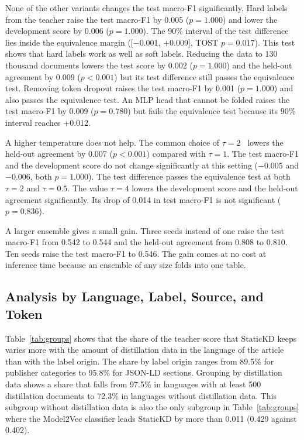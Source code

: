 \documentclass{ieeeaccess}
\begin{document}
None of the other variants changes the test macro-F1 significantly. Hard labels from the teacher raise the test macro-F1 by 0.005 ($p=1.000$) and lower the development score by 0.006 ($p=1.000$). The 90\% interval of the test difference lies inside the equivalence margin ([$-$0.001, +0.009], TOST $p=0.017$). This test shows that hard labels work as well as soft labels. Reducing the data to 130 thousand documents lowers the test score by 0.002 ($p=1.000$) and the held-out agreement by 0.009 ($p<0.001$) but its test difference still passes the equivalence test. Removing token dropout raises the test macro-F1 by 0.001 ($p=1.000$) and also passes the equivalence test. An MLP head that cannot be folded raises the test macro-F1 by 0.009 ($p=0.780$) but fails the equivalence test because its 90\% interval reaches +0.012.

A higher temperature does not help. The common choice of $\tau=2$~\cite{hinton2015distilling} lowers the held-out agreement by 0.007 ($p<0.001$) compared with $\tau=1$. The test macro-F1 and the development score do not change significantly at this setting ($-$0.005 and $-$0.006, both $p=1.000$). The test difference passes the equivalence test at both $\tau=2$ and $\tau=0.5$. The value $\tau=4$ lowers the development score and the held-out agreement significantly. Its drop of 0.014 in test macro-F1 is not significant ($p=0.836$).

A larger ensemble gives a small gain. Three seeds instead of one raise the test macro-F1 from 0.542 to 0.544 and the held-out agreement from 0.808 to 0.810. Ten seeds raise the test macro-F1 to 0.546. The gain comes at no cost at inference time because an ensemble of any size folds into one table.

\subsection{Analysis by Language, Label, Source, and Token}
\label{sec:res-lang}
Table~\ref{tab:groups} shows that the share of the teacher score that StaticKD keeps varies more with the amount of distillation data in the language of the article than with the label origin. The share by label origin ranges from 89.5\% for publisher categories to 95.8\% for JSON-LD sections. Grouping by distillation data shows a share that falls from 97.5\% in languages with at least 500 distillation documents to 72.3\% in languages without distillation data. This subgroup without distillation data is also the only subgroup in Table~\ref{tab:groups} where the Model2Vec classifier leads StaticKD by more than 0.011 (0.429 against 0.402).
\end{document}
